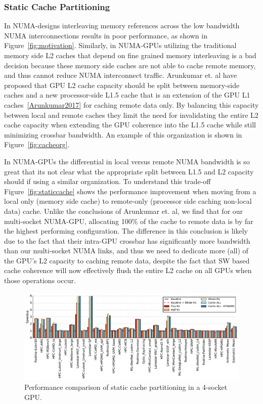 \subsubsection{Static Cache Partitioning}
In NUMA-designs interleaving memory references across the low bandwidth NUMA
interconnections results in poor performance, as shown in Figure~\ref{fig:motivation}.
Similarly, in NUMA-GPUs utilizing the traditional memory side L2 caches that 
depend on fine grained memory interleaving is a bad decision because these memory
side caches are not able to cache remote memory, and thus cannot reduce NUMA
interconnect traffic.  Arunkumar et. al have proposed that GPU L2 cache capacity
should be split between memory-side caches and a new processor-side L1.5 cache
that is an extension of the GPU L1 caches~\ref{Arunkumar2017} for caching remote
data only.  By balancing this capacity between local and remote caches they limit the 
need for invalidating the entire L2 cache capacity when extending the GPU coherence 
into the L1.5 cache while still minimizing crossbar bandwidth.  An example of this 
organization is shown in Figure~\ref{fig:cacheorg}.

In NUMA-GPUs the differential in local versus remote NUMA bandwidth is so great
that its not clear what the appropriate split between L1.5 and L2 capacity should
if using a similar organization.  To understand this trade-off Figure~\ref{fig:staticcache}
shows the performance improvement when moving from a local only (memory side cache)
to remote-only (processor side caching non-local data) cache.  Unlike the conclusions
of Arunkumar et. al, we find that for our multi-socket NUMA-GPU, allocating
100\% of the cache to remote data is by far the highest performing configuration.
The difference in this conclusion is likely due to the fact that their intra-GPU
crossbar has significantly more bandwidth than our multi-socket NUMA links, and thus
we need to dedicate more (all) of the GPU's L2 capacity to caching remote data, despite
the fact that SW based cache coherence will now effectively flush the entire L2 cache
on all GPUs when those operations occur.

\begin{figure}[tp]
    \centering
    \includegraphics[width=1.0\columnwidth]{figures/plot_remote_cache_WB.pdf}
    \caption{Performance comparison of static cache partitioning in a 4-socket GPU.}
    \label{fig:staticcaching}
\end{figure}

